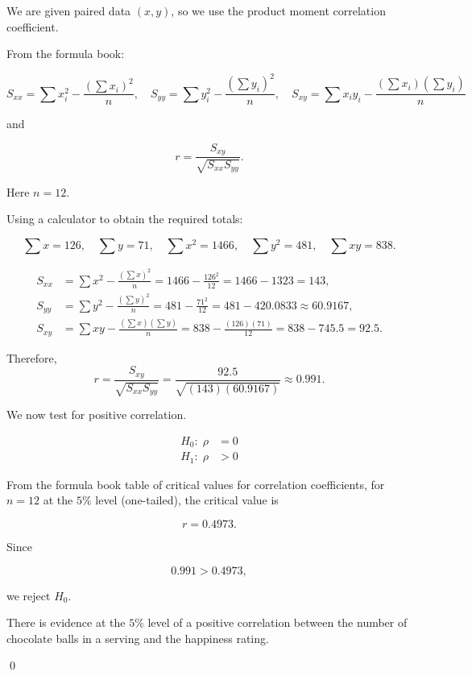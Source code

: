 \begin{solution}

We are given paired data $(x,y)$, so we use the product moment correlation coefficient.

From the formula book:

\[
S_{xx} = \sum x_i^2 - \frac{(\sum x_i)^2}{n},
\quad
S_{yy} = \sum y_i^2 - \frac{(\sum y_i)^2}{n},
\quad
S_{xy} = \sum x_i y_i - \frac{(\sum x_i)(\sum y_i)}{n}
\]

and

\[
r = \frac{S_{xy}}{\sqrt{S_{xx}S_{yy}}}.
\]

Here $n=12$.

Using a calculator to obtain the required totals:

\[
\sum x = 126,
\quad
\sum y = 71,
\quad
\sum x^2 = 1466,
\quad
\sum y^2 = 481,
\quad
\sum xy = 838.
\]

\begin{align*}
S_{xx}
&= \sum x^2 - \frac{(\sum x)^2}{n}
= 1466 - \frac{126^2}{12}
= 1466 - 1323
= 143,\\[6pt]
S_{yy}
&= \sum y^2 - \frac{(\sum y)^2}{n}
= 481 - \frac{71^2}{12}
= 481 - 420.0833
\approx 60.9167,\\[6pt]
S_{xy}
&= \sum xy - \frac{(\sum x)(\sum y)}{n}
= 838 - \frac{(126)(71)}{12}
= 838 - 745.5
= 92.5.
\end{align*}

Therefore,
\[
r=\frac{S_{xy}}{\sqrt{S_{xx}S_{yy}}}
=
\frac{92.5}{\sqrt{(143)(60.9167)}}
\approx 0.991.
\]

We now test for positive correlation.

\begin{align*}
H_0:\; \rho &= 0 \\
H_1:\; \rho &> 0
\end{align*}

From the formula book table of critical values for correlation coefficients,  
for $n=12$ at the $5\%$ level (one-tailed), the critical value is

\[
r = 0.4973.
\]

Since

\[
0.991 > 0.4973,
\]

we reject $H_0$.

There is evidence at the $5\%$ level of a positive correlation between the number of chocolate balls in a serving and the happiness rating.

\qed

\end{solution}

